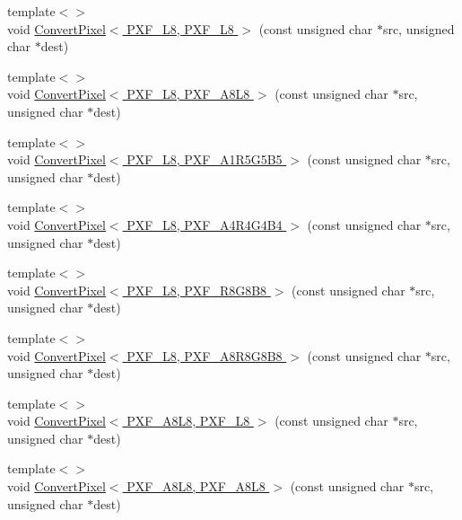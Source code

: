 \begin{DoxyCompactItemize}
\item 
{\footnotesize template$<$$>$ }\\void \hyperlink{_convert_pixel_8inl_afc29fce01775bb6e56912219e0ee3d3d}{Convert\+Pixel$<$ P\+X\+F\+\_\+\+L8, P\+X\+F\+\_\+\+L8 $>$} (const unsigned char $\ast$src, unsigned char $\ast$dest)
\item 
{\footnotesize template$<$$>$ }\\void \hyperlink{_convert_pixel_8inl_a24fabc100db5b6d2adf23050e4925827}{Convert\+Pixel$<$ P\+X\+F\+\_\+\+L8, P\+X\+F\+\_\+\+A8\+L8 $>$} (const unsigned char $\ast$src, unsigned char $\ast$dest)
\item 
{\footnotesize template$<$$>$ }\\void \hyperlink{_convert_pixel_8inl_af4c07bfc491c3977a5894a734156a59e}{Convert\+Pixel$<$ P\+X\+F\+\_\+\+L8, P\+X\+F\+\_\+\+A1\+R5\+G5\+B5 $>$} (const unsigned char $\ast$src, unsigned char $\ast$dest)
\item 
{\footnotesize template$<$$>$ }\\void \hyperlink{_convert_pixel_8inl_a583b9f9a0fa5a68dcad97f0d4c24c967}{Convert\+Pixel$<$ P\+X\+F\+\_\+\+L8, P\+X\+F\+\_\+\+A4\+R4\+G4\+B4 $>$} (const unsigned char $\ast$src, unsigned char $\ast$dest)
\item 
{\footnotesize template$<$$>$ }\\void \hyperlink{_convert_pixel_8inl_ac52d7adba712bb533ae95d42428b9bf5}{Convert\+Pixel$<$ P\+X\+F\+\_\+\+L8, P\+X\+F\+\_\+\+R8\+G8\+B8 $>$} (const unsigned char $\ast$src, unsigned char $\ast$dest)
\item 
{\footnotesize template$<$$>$ }\\void \hyperlink{_convert_pixel_8inl_a6a0287d0bb3e226c7eac450edd827570}{Convert\+Pixel$<$ P\+X\+F\+\_\+\+L8, P\+X\+F\+\_\+\+A8\+R8\+G8\+B8 $>$} (const unsigned char $\ast$src, unsigned char $\ast$dest)
\item 
{\footnotesize template$<$$>$ }\\void \hyperlink{_convert_pixel_8inl_ac48d1e6ac672e1e2e8d5746db9b30d9d}{Convert\+Pixel$<$ P\+X\+F\+\_\+\+A8\+L8, P\+X\+F\+\_\+\+L8 $>$} (const unsigned char $\ast$src, unsigned char $\ast$dest)
\item 
{\footnotesize template$<$$>$ }\\void \hyperlink{_convert_pixel_8inl_a2354d834255dcccf87944c2c39b05ba5}{Convert\+Pixel$<$ P\+X\+F\+\_\+\+A8\+L8, P\+X\+F\+\_\+\+A8\+L8 $>$} (const unsigned char $\ast$src, unsigned char $\ast$dest)
\item 

\end{DoxyCompactItemize}
